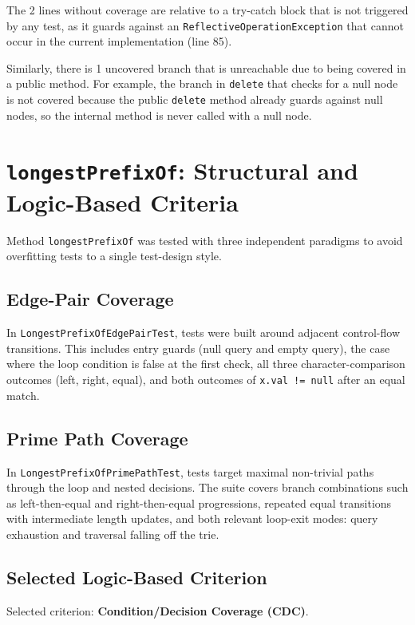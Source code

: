 The 2 lines without coverage are relative to a try-catch block that is not triggered by any test, as it guards against an \texttt{ReflectiveOperationException} that cannot occur in the current implementation (line 85).

Similarly, there is 1 uncovered branch that is unreachable due to being covered in a public method. For example, the branch in \texttt{delete} that checks for a null node is not covered because the public \texttt{delete} method already guards against null nodes, so the internal method is never called with a null node.

\section{\texttt{longestPrefixOf}: Structural and Logic-Based Criteria}

Method \texttt{longestPrefixOf} was tested with three independent paradigms to avoid overfitting tests to a single test-design style.

\subsection{Edge-Pair Coverage}

In \texttt{LongestPrefixOfEdgePairTest}, tests were built around adjacent control-flow transitions.
This includes entry guards (null query and empty query), the case where the loop condition is false at the first check,
all three character-comparison outcomes (left, right, equal), and both outcomes of \texttt{x.val != null} after an equal match.

\subsection{Prime Path Coverage}

In \texttt{LongestPrefixOfPrimePathTest}, tests target maximal non-trivial paths through the loop and nested decisions.
The suite covers branch combinations such as left-then-equal and right-then-equal progressions, repeated equal transitions
with intermediate length updates, and both relevant loop-exit modes: query exhaustion and traversal falling off the trie.

\subsection{Selected Logic-Based Criterion}

Selected criterion: \textbf{Condition/Decision Coverage (CDC)}.

